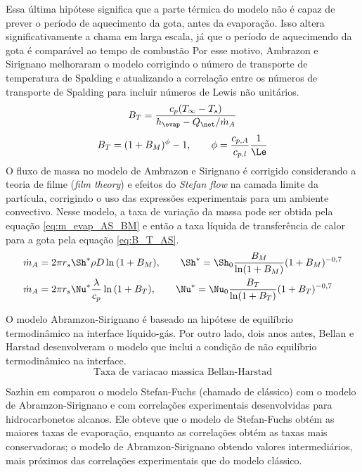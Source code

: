 Essa última hipótese significa que a parte térmica do modelo não é capaz de prever o período de aquecimento da gota, antes da evaporação.
Isso altera significativamente a chama em larga escala, já que o período de aquecimendo da gota é comparável ao tempo de combustão  
Por esse motivo, Ambrazon e Sirignano  melhoraram o modelo corrigindo o número de transporte de temperatura de Spalding
e atualizando a correlação entre os números de transporte de Spalding para incluir números de Lewis não unitários.
\begin{equation}
    B_T = \frac{c_p (T_\infty - T_s)}{h_\evap - Q_{\net}/\dot m_A} \label{eq:B_T_AS}
\end{equation}
\begin{equation}
    B_T = (1 + B_M)^\phi - 1,
    \qquad
    \phi=\frac{c_{p,A}}{c_{p,l}}\frac{1}{\Le}
    \label{eq:B_M_B_T}
\end{equation}
O fluxo de massa no modelo de Ambrazon e Sirignano é corrigido considerando a teoria de filme (\emph{film theory}) e efeitos do \emph{Stefan flow} na camada limite da partícula, corrigindo o uso das expressões experimentais para um ambiente convectivo.
Nesse modelo, a taxa de variação da massa pode ser obtida pela equação \eqref{eq:m_evap_AS_BM} e então a taxa líquida de transferência de calor para a gota pela equação \eqref{eq:B_T_AS}.
\begin{align}
\dot m_{A} &= 2 \pi r_s \Sh^* \rho D \ln{(1 + B_M)}              
,\qquad
\Sh^* = \Sh_0 \frac{B_M}{\ln (1 + B_M)} (1 + B_M)^{-0,7} \label{eq:m_evap_AS_BM}
\\
\dot m_A   &= 2 \pi r_s \Nu^* \frac{\lambda}{c_p} \ln{(1 + B_T)} 
,\qquad
\Nu^* = \Nu_0 \frac{B_T}{\ln (1 + B_T)} (1 + B_T)^{-0,7} \label{eq:m_evap_AS_BT}
\end{align}

O modelo Abramzon-Sirignano é baseado na hipótese de equilíbrio termodinâmico na interface líquido-gás.
Por outro lado, dois anos antes, Bellan e Harstad  desenvolveram o modelo que inclui a condição de não equilíbrio termodinâmico na interface.
\begin{equation}
    \text{Taxa de variacao massica Bellan-Harstad}
\end{equation}


Sazhin em  comparou o modelo Stefan-Fuchs (chamado de clássico) com o modelo de Abramzon-Sirignano e com correlações experimentais desenvolvidas para hidrocarbonetos alcanos.
Ele obteve que o modelo de Stefan-Fuchs obtém as maiores taxas de evaporação, enquanto as correlações obtém as taxas mais conservadoras; o modelo de Abramzon-Sirignano obtendo valores intermediários, mais próximos das correlações experimentais que do modelo clássico.

